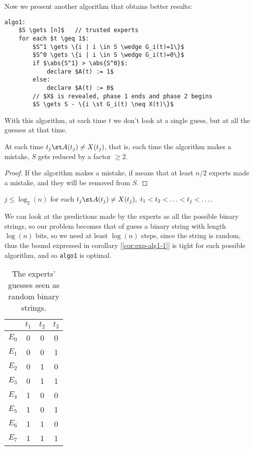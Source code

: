 Now we present another algorithm that obtains better results:
\begin{lstlisting}[caption={Algo 1}, label={lst:exp-algo1}]
algo1:
    $S \gets [n]$   // trusted experts
    for each $t \geq 1$:
        $S^1 \gets \{i | i \in S \wedge G_i(t)=1\}$
        $S^0 \gets \{i | i \in S \wedge G_i(t)=0\}$
        if $\abs{S^1} > \abs{S^0}$:
            declare $A(t) := 1$
        else:
            declare $A(t) := 0$
        // $X$ is revealed, phase 1 ends and phase 2 begins
        $S \gets S - \{i \st G_i(t) \neq X(t)\}$
\end{lstlisting}

\obs With this algorithm, at each time $t$ we don't look at a single guess, but at all the guesses at that time.

\begin{lem}\label{lem:exp-alg1-1}
    At each time $t_j \st A(t_j) \neq X(t_j)$, that is, each time the algorithm makes a mistake, $S$ gets reduced by a factor $\geq 2$.
\end{lem}
\begin{proof}
    If the algorithm makes a mistake, if means that at least $n/2$ experts made a mistake, and they will be removed from $S$.
\end{proof}

\begin{cor}\label{cor:exp-alg1-1}
    $j \leq \log_2(n)$ for each $t_j \st A(t_j) \neq X(t_j),\ t_1 < t_2 < \ldots < t_j < \ldots$.
\end{cor}

\begin{obs}
    We can look at the predictions made by the experts as all the possible binary strings, so our problem becomes that of guess a binary string with length $\log(n)$ bits, so we need at least $\log(n)$ steps, since the string is random, thus the bound expressed in corollary [\ref{cor:exp-alg1-1}] is tight for each possible algorithm, and so \texttt{algo1} is optimal.
    
    \begin{table}[ht]
        \centering
        \begin{tabular}{c|c|c|c}
            & $t_1$ & $t_2$ & $t_3$ \\ \hline
            $E_0$ & 0     & 0     & 0     \\
            $E_1$ & 0     & 0     & 1     \\
            $E_2$ & 0     & 1     & 0     \\
            $E_3$ & 0     & 1     & 1     \\
            $E_4$ & 1     & 0     & 0     \\
            $E_5$ & 1     & 0     & 1     \\
            $E_6$ & 1     & 1     & 0     \\
            $E_7$ & 1     & 1     & 1    
        \end{tabular}
        \caption{The experts' guesses seen as random binary strings.}
        \label{tab:exp-alg1-strings}
    \end{table}
\end{obs}


